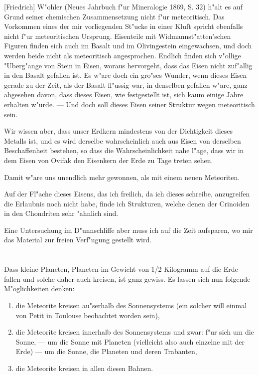 \documentclass[a4paper, 11pt, oneside]{article}
\begin{document}
[Friedrich] W"ohler (Neues Jahrbuch f"ur Mineralogie 1869, S. 32) h"alt es auf Grund seiner chemischen Zusammensetzung nicht f"ur meteoritisch. Das Vorkommen eines der mir vorliegenden St"ucke in einer Kluft spricht ebenfalls nicht f"ur meteoritischen Ursprung. Eisenteile mit Widmannst"atten'schen Figuren finden sich auch im Basalt und im Olivingestein eingewachsen, und doch werden beide nicht als meteoritisch angesprochen. Endlich finden sich v"ollige "Uberg"ange von Stein in Eisen, woraus hervorgeht, dass das Eisen nicht zuf"allig in den Basalt gefallen ist. Es w"are doch ein gro"ses Wunder, wenn dieses Eisen gerade zu der Zeit, als der Basalt fl"ussig war, in denselben gefallen w"are, ganz abgesehen davon, dass dieses Eisen, wie festgestellt ist, sich kaum einige Jahre erhalten w"urde. --- Und doch soll dieses Eisen seiner Struktur wegen meteoritisch sein.

Wir wissen aber, dass unser Erdkern mindestens von der Dichtigkeit dieses Metalls ist, und es wird derselbe wahrscheinlich auch aus Eisen von derselben Beschaffenheit bestehen, so dass die Wahrscheinlichkeit nahe l"age, dass wir in dem Eisen von Ovifak den Eisenkern der Erde zu Tage treten sehen.

Damit w"are uns unendlich mehr gewonnen, als mit einem neuen Meteoriten.

Auf der Fl"ache dieses Eisens, das ich freilich, da ich dieses schreibe, anzugreifen die Erlaubnis noch nicht habe, finde ich Strukturen, welche denen der Crinoiden in den Chondriten sehr "ahnlich sind.

Eine Untersuchung im D"unnschliffe aber muss ich auf die Zeit aufsparen, wo mir das Material zur freien Verf"ugung gestellt wird.
\clearpage
\section{}
\subsection{}
\paragraph{}
Dass kleine Planeten, Planeten im Gewicht von 1/2 Kilogramm auf die Erde fallen und solche daher auch kreisen, ist ganz gewiss. Es lassen sich nun folgende M"oglichkeiten denken:
\begin{enumerate}
\item die Meteorite kreisen au"serhalb des Sonnensystems (ein solcher will einmal von Petit in Toulouse beobachtet worden sein),
\item die Meteorite kreisen innerhalb des Sonnensystems und zwar: f"ur sich um die Sonne, --- um die Sonne mit Planeten (vielleicht also auch einzelne mit der Erde) --- um die Sonne, die Planeten und deren Trabanten,
\item die Meteorite kreisen in allen diesen Bahnen.
\end{enumerate}
\end{document}
